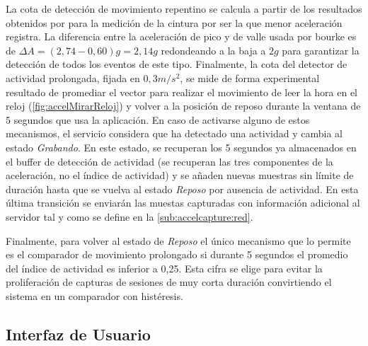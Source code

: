 La cota de detección de movimiento repentino se calcula a partir de los resultados obtenidos por  para la medición de la cintura por ser la que menor aceleración registra. La diferencia entre la aceleración de pico y de valle usada por bourke es de $\Delta A = (2,74 - 0,60)g = 2,14g$ redondeando a la baja a $2g$ para garantizar la detección de todos los eventos de este tipo. Finalmente, la cota del detector de actividad prolongada, fijada en $0,3m/s^2$, se mide de forma experimental resultado de promediar el vector para realizar el movimiento de leer la hora en el reloj (\autoref{fig:accelMirarReloj}) y volver a la posición de reposo durante la ventana de 5 segundos que usa la aplicación. En caso de activarse alguno de estos mecanismos, el servicio considera que ha detectado una actividad y cambia al estado \textit{Grabando}. En este estado, se recuperan los 5 segundos ya almacenados en el buffer de detección de actividad (se recuperan las tres componentes de la aceleración, no el índice de actividad) y se añaden nuevas muestras sin límite de duración hasta que se vuelva al estado \textit{Reposo} por ausencia de actividad. En esta última transición se enviarán las muestas capturadas con información adicional al servidor tal y como se define en la \autoref{sub:accelcapture:red}.

Finalmente, para volver al estado de \textit{Reposo} el único mecanismo que lo permite es el comparador de movimiento prolongado si durante 5 segundos el promedio del índice de actividad es inferior a 0,25. Esta cifra se elige para evitar la proliferación de capturas de sesiones de muy corta duración convirtiendo el sistema en un comparador con histéresis.


\subsection{Interfaz de Usuario}\label{sub:accelcapture:interfaz}

